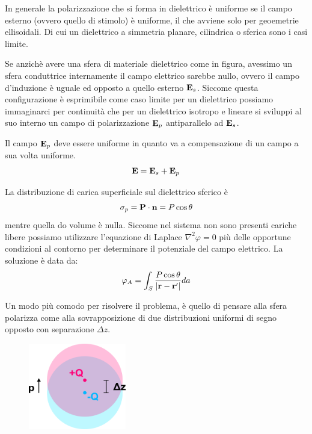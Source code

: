 In generale la polarizzazione che si forma in dielettrico \`e uniforme se il campo esterno (ovvero quello di stimolo) \`e uniforme, il che avviene solo per geoemetrie ellisoidali. Di cui un dielettrico a simmetria planare, cilindrica o sferica sono i casi limite.

Se anzich\`e avere una sfera di materiale dielettrico come in figura, avessimo un sfera conduttrice  internamente il campo elettrico sarebbe nullo, ovvero il campo d'induzione \`e uguale ed opposto a quello esterno $\bold{E}_{s}$. Siccome questa configurazione \`e esprimibile come caso limite per un dielettrico possiamo immaginarci per continuit\`a che per un dielettrico isotropo e lineare si sviluppi al suo interno un campo di polarizzazione $\bold{E}_{p}$ antiparallelo ad $\bold{E}_{s}$.

Il campo $\bold{E}_{p}$ deve essere uniforme in quanto va a compensazione di un campo a sua volta uniforme. 
\begin{equation*}
	\bold{E} = \bold{E}_{s} + \bold{E}_{p}
\end{equation*}

La distribuzione di carica superficiale sul dielettrico sferico \`e 
\begin{equation*}
	\sigma_{p} = \bold{P} \cdot \bold{n} = P \cos \theta 
\end{equation*}
mentre quella do volume \`e nulla.  Siccome nel sistema non sono presenti cariche libere possiamo utilizzare l'equazione di Laplace $\nabla^2\varphi = 0$ pi\`u delle opportune condizioni al contorno per determinare il potenziale del campo elettrico. La soluzione \`e  data da: 
\begin{equation*}
	\varphi_{A} = \int_{S} \frac{P \cos \theta }{|\bold{r}- \bold{r}'|}da
\end{equation*}

Un modo pi\`u comodo per risolvere il problema, \`e quello di pensare alla sfera polarizza come alla sovrapposizione di due distribuzioni uniformi di segno opposto con separazione $\Delta z$.
\begin{figure} %
    \vspace{-0.3cm}
    \centering
    \includegraphics[width=0.38\textwidth]{images/chargepole} %
\end{figure}

